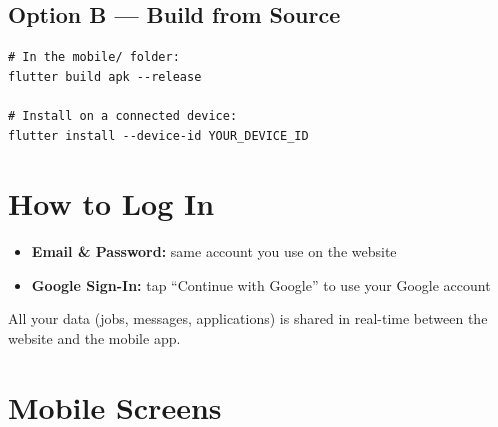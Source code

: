 \documentclass[12pt, a4paper]{report}
\begin{document}
\subsection{Option B --- Build from Source}
\begin{lstlisting}[style=bashstyle]
# In the mobile/ folder:
flutter build apk --release

# Install on a connected device:
flutter install --device-id YOUR_DEVICE_ID
\end{lstlisting}

\section{How to Log In}

\begin{itemize}
  \item \textbf{Email \& Password:} same account you use on the website
  \item \textbf{Google Sign-In:} tap ``Continue with Google'' to use your Google account
\end{itemize}

All your data (jobs, messages, applications) is shared in real-time between
the website and the mobile app.

\section{Mobile Screens}
\end{document}
